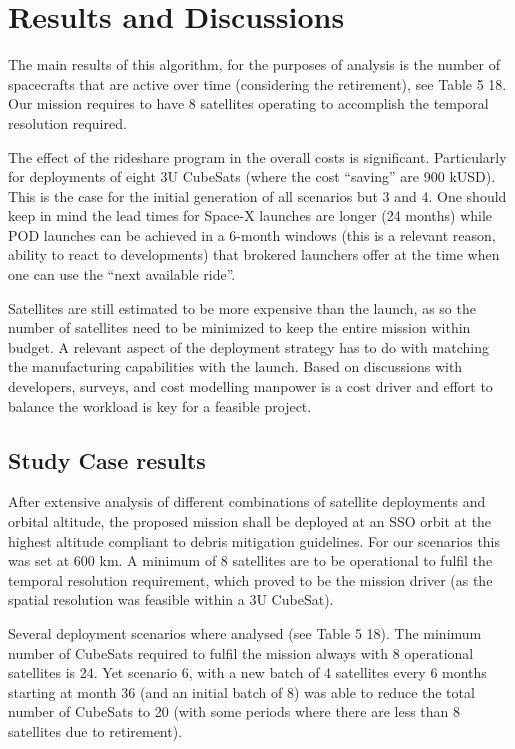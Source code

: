 \section{Results and Discussions}

The main results of this algorithm, for the purposes of analysis is the number of spacecrafts that are active over time (considering the retirement), see Table 5 18. Our mission requires to have 8 satellites operating to accomplish the temporal resolution required.


The effect of the rideshare program in the overall costs is significant. Particularly for deployments of eight 3U CubeSats (where the cost “saving” are 900 kUSD). This is the case for the initial generation of all scenarios but 3 and 4. One should keep in mind the lead times for Space-X launches are longer (24 months) while POD launches can be achieved in a 6-month windows (this is a relevant reason, ability to react to developments) that brokered launchers offer at the time when one can use the “next available ride”.

Satellites are still estimated to be more expensive than the launch, as so the number of satellites need to be minimized to keep the entire mission within budget. A relevant aspect of the deployment strategy has to do with matching the manufacturing capabilities with the launch. Based on discussions with developers, surveys, and cost modelling manpower is a cost driver and effort to balance the workload is key for a feasible project.

\subsection{Study Case results}

After extensive analysis of different combinations of satellite deployments and orbital altitude, the proposed mission shall be deployed at an SSO orbit at the highest altitude compliant to debris mitigation guidelines. For our scenarios this was set at 600 km. 
A minimum of 8 satellites are to be operational to fulfil the temporal resolution requirement, which proved to be the mission driver (as the spatial resolution was feasible within a 3U CubeSat).

Several deployment scenarios where analysed (see Table 5 18). The minimum number of CubeSats required to fulfil the mission always with 8 operational satellites is 24. Yet scenario 6, with a new batch of 4 satellites every 6 months starting at month 36 (and an initial batch of 8) was able to reduce the total number of CubeSats to 20 (with some periods where there are less than 8 satellites due to retirement).

